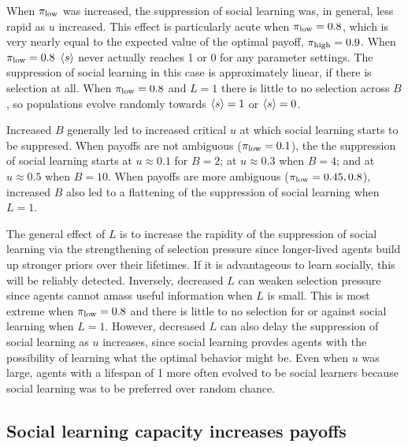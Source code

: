 \documentclass[letterpaper,11.5pt]{scrartcl}
\begin{document}
When $\pi_{\mathrm{low}}$ was increased, the suppression of social learning was, in
general, less rapid as $u$ increased. This effect is particularly acute when
$\pi_{\mathrm{low}} = 0.8$, which is very nearly equal to the expected value of the optimal
payoff, $\pi_{\mathrm{high}} = 0.9$. When $\pi_{\mathrm{low}} = 0.8$ $\langle s \rangle$ never actually reaches 
1 or 0 for any parameter settings. The suppression of social learning in this
case is approximately linear, if there is selection at all. When $\pi_{\mathrm{low}} = 0.8$
and $L = 1$ there is little to no selection across $B$, 
so populations evolve randomly towards $\langle s \rangle = 1$ or $\langle s \rangle = 0$. 

Increased $B$ generally led to increased critical $u$ at which social learning
starts to be suppresed. When payoffs are not ambiguous ($\pi_{\mathrm{low}} = 0.1$), the the
suppression of social learning starts at $u \approx 0.1$ for $B=2$; at $u \approx
0.3$ when $B=4$; and at $u \approx 0.5$ when $B=10$.  When payoffs are more
ambiguous ($\pi_{\mathrm{low}} = 0.45,0.8$), increased $B$ also led to a flattening of the
suppression of social learning when $L=1$. 

The general effect of $L$ is to increase the rapidity of the suppression of social
learning via the strengthening of selection pressure since longer-lived agents
build up stronger priors over their lifetimes. If it is advantageous to
learn socially, this will be reliably detected. Inversely, decreased $L$
can weaken selection pressure since agents cannot amass useful information when
$L$ is small. This is most extreme when $\pi_{\mathrm{low}} = 0.8$ and there is little to
no selection for or against social learning when $L=1$. However, decreased $L$ can
also delay the suppression of social learning as $u$ increases, since social
learning provdes agents with the possibility of learning what the optimal behavior
might be.  Even when $u$ was large, agents with a lifespan of 1 more often evolved
to be social learners because social learning was to be preferred over random
chance.


\subsection{Social learning capacity increases payoffs}
\end{document}
